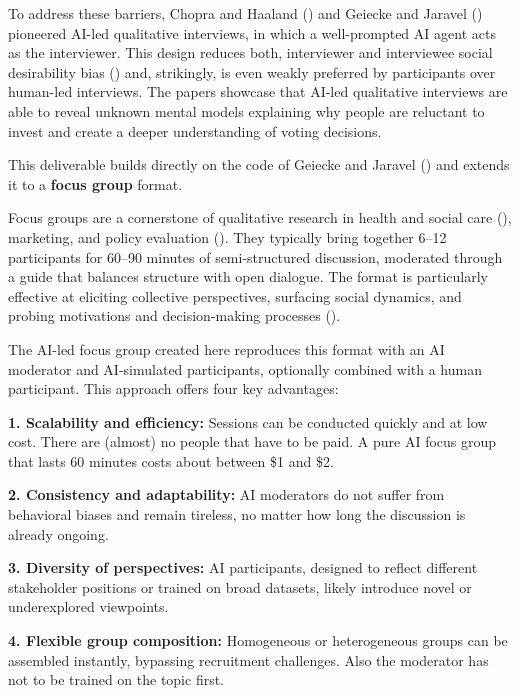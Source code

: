 \documentclass[
  letterpaper,
  DIV=11,
  numbers=noendperiod]{scrartcl}
\begin{document}
To address these barriers, Chopra and Haaland
() and Geiecke and Jaravel
() pioneered AI-led qualitative
interviews, in which a well-prompted AI agent acts as the interviewer.
This design reduces both, interviewer and interviewee social
desirability bias
()
and, strikingly, is even weakly preferred by participants over human-led
interviews. The papers showcase that AI-led qualitative interviews are
able to reveal unknown mental models explaining why people are reluctant
to invest and create a deeper understanding of voting decisions.

This deliverable builds directly on the code of Geiecke and Jaravel
() and extends it to a
\textbf{focus group} format.

Focus groups are a cornerstone of qualitative research in health and
social care (), marketing, and
policy evaluation (). They
typically bring together 6--12 participants for 60--90 minutes of
semi-structured discussion, moderated through a guide that balances
structure with open dialogue. The format is particularly effective at
eliciting collective perspectives, surfacing social dynamics, and
probing motivations and decision-making processes
().

The AI-led focus group created here reproduces this format with an AI
moderator and AI-simulated participants, optionally combined with a
human participant. This approach offers four key advantages:

\textbf{1. Scalability and efficiency:} Sessions can be conducted
quickly and at low cost. There are (almost) no people that have to be
paid. A pure AI focus group that lasts 60 minutes costs about between
\$1 and \$2.

\textbf{2. Consistency and adaptability:} AI moderators do not suffer
from behavioral biases and remain tireless, no matter how long the
discussion is already ongoing.

\textbf{3. Diversity of perspectives:} AI participants, designed to
reflect different stakeholder positions or trained on broad datasets,
likely introduce novel or underexplored viewpoints.

\textbf{4. Flexible group composition:} Homogeneous or heterogeneous
groups can be assembled instantly, bypassing recruitment challenges.
Also the moderator has not to be trained on the topic first.
\end{document}
